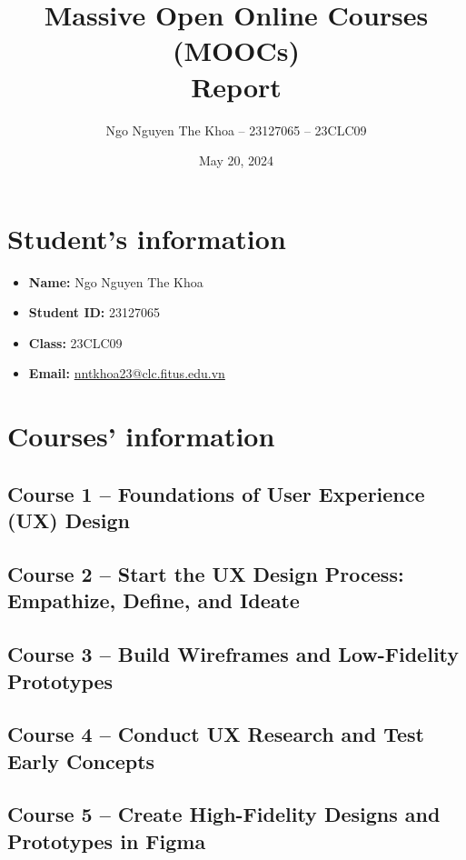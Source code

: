 \documentclass[a4paper,12pt]{report}
\title{Massive Open Online Courses (MOOCs)\\Report}
\author{Ngo Nguyen The Khoa -- 23127065 -- 23CLC09}
\date{May 20, 2024}
\begin{document}

\tableofcontents\thispagestyle{empty}

\pagebreak
\section{Student's information}
\begin{itemize}
  \item \textbf{Name:} Ngo Nguyen The Khoa
  \item \textbf{Student ID:} 23127065
  \item \textbf{Class:} 23CLC09
  \item \textbf{Email:} \href{mailto:nntkhoa23@clc.fitus.edu.vn}{nntkhoa23@clc.fitus.edu.vn}
\end{itemize}

\pagebreak
\section{Courses' information}


\pagebreak
\subsection[Foundations of User Experience (UX) Design]{Course 1 -- Foundations of User Experience (UX) Design}


\pagebreak
\subsection[Start the UX Design Process: Empathize, Define, and Ideate]{Course 2 -- Start the UX Design Process: Empathize, Define, and Ideate}


\pagebreak
\subsection[Build Wireframes and Low-Fidelity Prototypes]{Course 3 -- Build Wireframes and Low-Fidelity Prototypes}


\pagebreak
\subsection[Conduct UX Research and Test Early Concepts]{Course 4 -- Conduct UX Research and Test Early Concepts}


\pagebreak
\subsection[Create High-Fidelity Designs and Prototypes in Figma]{Course 5 -- Create High-Fidelity Designs and Prototypes in Figma}

\end{document}
